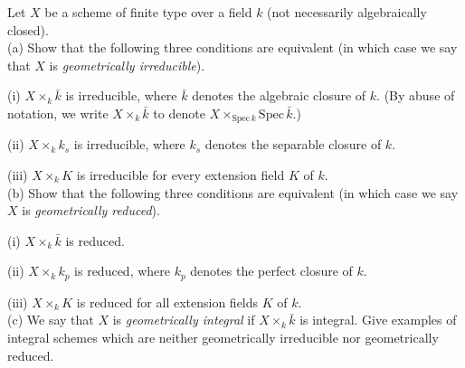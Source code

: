 \begin{exe}
	\label{2.3.15}
	Let $X$ be a scheme of finite type over a field $k$ (not necessarily algebraically closed).\\
	(a) Show that the following three conditions are equivalent (in which case we say that $X$ is \emph{geometrically irreducible}).
	
	(i) $X \times_{k} \bar{k}$ is irreducible, where $\bar{k}$ denotes the algebraic closure of $k$. (By abuse of notation, we write $X\times_k\bar{k}$ to denote $X\times_{\mathrm{Spec}\,k}\mathrm{Spec}\,\bar{k}$.)
	
	(ii) $X \times_{k} k_{s}$ is irreducible, where $k_{s}$ denotes the separable closure of $k$.
	
	(iii) $X \times_{k} K$ is  irreducible for every extension field $K$ of $k$.\\
	(b) Show that the following three conditions are equivalent (in which case we say $X$ is \emph{geometrically reduced}).
	
	(i) $X \times_{k} \bar{k}$ is reduced.
	
	(ii) $X \times_{k} k_{p}$ is reduced, where $k_{p}$ denotes the perfect closure of $k$.
	
	(iii) $X \times_{k} K$ is reduced for all extension fields $K$ of $k$.\\
	(c) We say that $X$ is \emph{geometrically integral} if $X \times_{k} \bar{k}$ is integral. Give examples of integral schemes which are neither geometrically irreducible nor geometrically reduced.
\end{exe}
